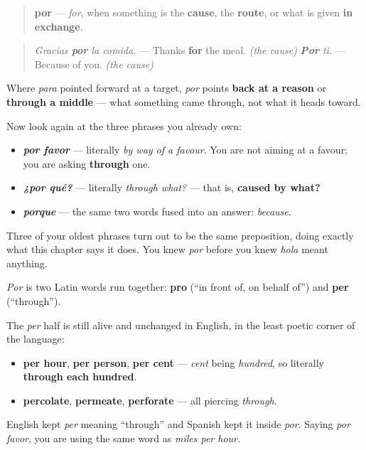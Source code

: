 \begin{grammarlens}[title={Grammar Lens: the arrow points back, or through}]
\begin{quote}
\textbf{por} — \emph{for}, when something is the \textbf{cause}, the \textbf{route}, or what is given \textbf{in exchange}.
\end{quote}

\begin{quote}
\emph{Gracias \textbf{por} la comida.} — Thanks \textbf{for} the meal. \emph{(the cause)} \emph{\textbf{Por} ti.} — Because of you. \emph{(the cause)}
\end{quote}

Where \emph{para} pointed forward at a target, \emph{por} points \textbf{back at a reason} or \textbf{through a middle} — what something came through, not what it heads toward.

Now look again at the three phrases you already own:

\begin{itemize}
\raggedright
  \item \emph{\textbf{por favor}} — literally \emph{by way of a favour}. You are not aiming at a favour; you are asking \textbf{through} one.
  \item \emph{\textbf{¿por qué?}} — literally \emph{through what?} — that is, \textbf{caused by what?}
  \item \emph{\textbf{porque}} — the same two words fused into an answer: \emph{because}.
\end{itemize}

Three of your oldest phrases turn out to be the same preposition, doing exactly what this chapter says it does. You knew \emph{por} before you knew \emph{hola} meant anything.
\end{grammarlens}

\begin{cousinweb}
\emph{Por} is two Latin words run together: \textbf{pro} (\textquotedblleft{}in front of, on behalf of\textquotedblright{}) and \textbf{per} (\textquotedblleft{}through\textquotedblright{}).

The \emph{per} half is still alive and unchanged in English, in the least poetic corner of the language:

\begin{itemize}
\raggedright
  \item \textbf{per hour}, \textbf{per person}, \textbf{per cent} — \emph{cent} being \emph{hundred}, so literally \textbf{through each hundred}.
  \item \textbf{percolate}, \textbf{permeate}, \textbf{perforate} — all piercing \emph{through}.
\end{itemize}

English kept \emph{per} meaning \textquotedblleft{}through\textquotedblright{} and Spanish kept it inside \emph{por}. Saying \emph{por favor}, you are using the same word as \emph{miles per hour}.
\end{cousinweb}


